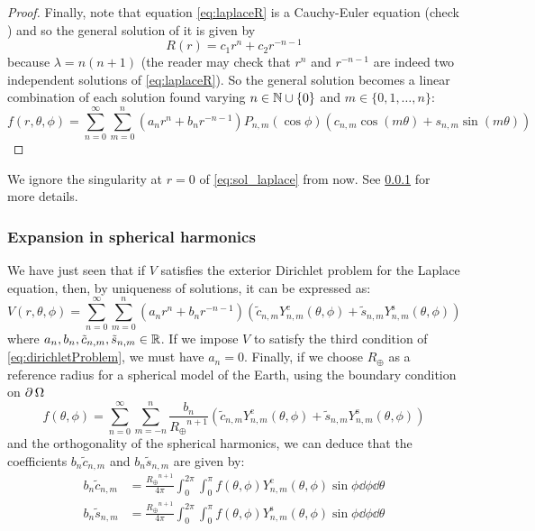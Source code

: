 \documentclass[../main.tex]{subfiles}
\begin{document}
\begin{proof}
  Finally, note that equation \cref{eq:laplaceR} is a Cauchy-Euler equation (check \cite{wiki:cauchy-euler}) and so the general solution of it is given by
  \begin{equation}
    R(r) = c_1 r^{n} + c_2 r^{-n-1}
  \end{equation}
  because $\lambda = n(n+1)$ (the reader may check that $r^n$ and $r^{-n-1}$ are indeed two independent solutions of \cref{eq:laplaceR}). So the general solution becomes a linear combination of each solution found varying $n\in\mathbb{N}\cup\{0\}$ and $m\in\{0,1,\dots,n\}$:
  \begin{equation}
    f(r,\theta,\phi) = \sum_{n=0}^\infty \sum_{m=0}^n (a_n r^{n} +b_{n}r^{-n-1})P_{n,m}(\cos\phi) (c_{n,m}\cos(m\theta)+s_{n,m}\sin(m\theta))
  \end{equation}
\end{proof}
We ignore the singularity at $r=0$ of \cref{eq:sol_laplace} from now. See \cref{sec:laplace_spherical_potential} for more details.
\subsubsection{Expansion in spherical harmonics}\label{sec:laplace_spherical_potential}
We have just seen that if $V$ satisfies the exterior Dirichlet problem for the Laplace equation, then, by uniqueness of solutions, it can be expressed as:
\begin{equation}\label{eq:prePotential}
  V(r,\theta,\phi) = \sum_{n=0}^\infty \sum_{m=0}^n (a_n r^{n} +b_{n}r^{-n-1})(\tilde{c}_{n,m}Y_{n,m}^{\mathrm{c}}(\theta,\phi)+\tilde{s}_{n,m}Y_{n,m}^{\mathrm{s}}(\theta,\phi))
\end{equation}
where $a_n,b_n,\tilde{c}_{n,m},\tilde{s}_{n,m}\in\mathbb{R}$. If we impose $V$ to satisfy the third condition of \cref{eq:dirichletProblem}, we must have $a_{n}=0$.
Finally, if we choose $R_\oplus$ as a reference radius for a spherical model of the Earth, using the boundary condition on $\operatorname{\partial}{\Omega}$
\begin{equation}
  f(\theta,\phi) = \sum_{n=0}^\infty \sum_{m=-n}^n \frac{b_{n}}{{R_\oplus}^{n+1}}(\tilde{c}_{n,m}Y_{n,m}^{\mathrm{c}}(\theta,\phi)+\tilde{s}_{n,m}Y_{n,m}^{\mathrm{s}}(\theta,\phi))
\end{equation}
and the orthogonality of the spherical harmonics, we can deduce that the coefficients $b_n\tilde{c}_{n,m}$ and $b_n\tilde{s}_{n,m}$ are given by:
\begin{align}
  b_n\tilde{c}_{n,m} & =\frac{{R_\oplus}^{n+1}}{4\pi}\int_0^{2\pi}\int_0^\pi f(\theta,\phi) Y_{n,m}^\mathrm{c}(\theta,\phi)\sin\phi\dd{\phi}\dd{\theta} \\
  b_n\tilde{s}_{n,m} & =\frac{{R_\oplus}^{n+1}}{4\pi}\int_0^{2\pi}\int_0^\pi f(\theta,\phi) Y_{n,m}^\mathrm{s}(\theta,\phi)\sin\phi\dd{\phi}\dd{\theta}
\end{align}
\end{document}
